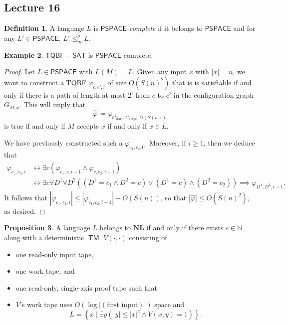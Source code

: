 \documentclass[10pt,letterpaper,cm]{nupset}
\theoremstyle{definition}
\newtheorem{definition}{Definition}[subsection]
\newtheorem{exmp}[definition]{Example}
\theoremstyle{theorem}
\newtheorem{prop}[definition]{Proposition}
\theoremstyle{remark}
\newcommand{\N}{\mathbb N}
\newcommand{\1}{\mathbf{1}}
\newcommand{\accpt}{\mathrm{accpt}}
\newcommand{\0}{\vec 0}
\DeclareMathOperator{\TM}{\mathsf{TM}}
\begin{document}
\subsection{Lecture 16}

\begin{definition}
A language $L$ is \textit{$\mathsf{PSPACE}$-complete} if it belongs to $\mathsf{PSPACE}$ and for any $L' \in \mathsf{PSPACE}$, $L' \leq_m^p L$.
\end{definition}

\begin{exmp}
$\mathsf{TQBF{-}SAT} $ is $\mathsf{PSPACE}$-complete.
\end{exmp}
\begin{proof}
Let $L \in \mathsf{PSPACE}$ with $L(M) = L$. Given any input $x$ with $\left\lvert{x}\right\rvert =n$, we want to construct a TQBF $\varphi_{c, c', i}$ of size $O\left(S(n)^2\right)$ that is is satisfiable if and only if there is a path of length at most $2^i$ from $c$ to $c'$ in the configuration graph $G_{M,x}$. This will imply that $$\hat{\varphi}\coloneqq \varphi_{C_{\mathrm{start}}, C_{\accpt}, O(S(n))}$$ is true if and only if $M$ accepts $x$ if and only if $x\in L$.


 We have previously constructed such a $\varphi_{c_1, c_2, 0}$. Moreover, if $i\geq 1$, then we deduce that 
\begin{align*}
\varphi_{c_1, c_2, i} & \leftrightarrow \exists c\left(\varphi_{c_1, c, i-1} \land \varphi_{c, c_2, i-1}\right)
\\ & \leftrightarrow \exists c \forall D^1 \forall D^2\left(\left(D^1 = c_1 \land D^2 = c\right) \vee \left(D^1 = c\right) \land \left(D^2 = c_2\right)\right) \implies \varphi_{D^1, D^2, i-1}.
\end{align*}
It follows that $\left\lvert{\varphi_{c_1, c_2, i}}\right\rvert\leq \left\lvert{\varphi_{c_1, c_2, i-1}}\right\rvert +O(S(n))$, so that $\left\lvert{\hat{\varphi}}\right\rvert \leq O\left(S(n)^2\right)$, as desired.
\end{proof}

\begin{prop}
A language $L$ belongs to $\mathbf{NL}$ if and only if there exists $c\in \N$ along with a deterministic $\TM$ $V(\cdot, \cdot)$ consisting of 
\begin{itemize}
\item one read-only input tape, 
\item one work tape, and 
\item one read-only, single-axis proof tape  such that 
\item $V$'s work tape uses $O\left(\log{\left\lvert{\left(\text{first input}\right)}\right\rvert}\right)$ space and $$L = \left\{ x \mid \exists y\left(\left\lvert{y}\right\rvert \leq \left\lvert{x}\right\rvert^{c} \land V\left(x,y\right) = 1\right)\right\}.$$ 
\end{itemize}
\end{prop}
\end{document}
